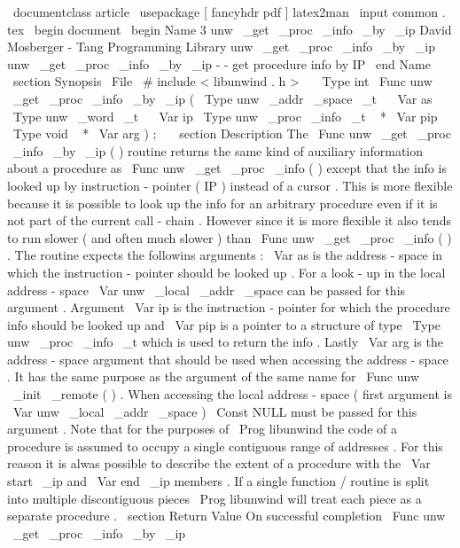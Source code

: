 \
documentclass
{
article
}
\
usepackage
[
fancyhdr
pdf
]
{
latex2man
}
\
input
{
common
.
tex
}
\
begin
{
document
}
\
begin
{
Name
}
{
3
}
{
unw
\
_get
\
_proc
\
_info
\
_by
\
_ip
}
{
David
Mosberger
-
Tang
}
{
Programming
Library
}
{
unw
\
_get
\
_proc
\
_info
\
_by
\
_ip
}
unw
\
_get
\
_proc
\
_info
\
_by
\
_ip
-
-
get
procedure
info
by
IP
\
end
{
Name
}
\
section
{
Synopsis
}
\
File
{
\
#
include
<
libunwind
.
h
>
}
\
\
\
Type
{
int
}
\
Func
{
unw
\
_get
\
_proc
\
_info
\
_by
\
_ip
}
(
\
Type
{
unw
\
_addr
\
_space
\
_t
~
}
\
Var
{
as
}
\
Type
{
unw
\
_word
\
_t
~
}
\
Var
{
ip
}
\
Type
{
unw
\
_proc
\
_info
\
_t
~
*
}
\
Var
{
pip
}
\
Type
{
void
~
*
}
\
Var
{
arg
}
)
;
\
\
\
section
{
Description
}
The
\
Func
{
unw
\
_get
\
_proc
\
_info
\
_by
\
_ip
}
(
)
routine
returns
the
same
kind
of
auxiliary
information
about
a
procedure
as
\
Func
{
unw
\
_get
\
_proc
\
_info
}
(
)
except
that
the
info
is
looked
up
by
instruction
-
pointer
(
IP
)
instead
of
a
cursor
.
This
is
more
flexible
because
it
is
possible
to
look
up
the
info
for
an
arbitrary
procedure
even
if
it
is
not
part
of
the
current
call
-
chain
.
However
since
it
is
more
flexible
it
also
tends
to
run
slower
(
and
often
much
slower
)
than
\
Func
{
unw
\
_get
\
_proc
\
_info
}
(
)
.
The
routine
expects
the
followins
arguments
:
\
Var
{
as
}
is
the
address
-
space
in
which
the
instruction
-
pointer
should
be
looked
up
.
For
a
look
-
up
in
the
local
address
-
space
\
Var
{
unw
\
_local
\
_addr
\
_space
}
can
be
passed
for
this
argument
.
Argument
\
Var
{
ip
}
is
the
instruction
-
pointer
for
which
the
procedure
info
should
be
looked
up
and
\
Var
{
pip
}
is
a
pointer
to
a
structure
of
type
\
Type
{
unw
\
_proc
\
_info
\
_t
}
which
is
used
to
return
the
info
.
Lastly
\
Var
{
arg
}
is
the
address
-
space
argument
that
should
be
used
when
accessing
the
address
-
space
.
It
has
the
same
purpose
as
the
argument
of
the
same
name
for
\
Func
{
unw
\
_init
\
_remote
}
(
)
.
When
accessing
the
local
address
-
space
(
first
argument
is
\
Var
{
unw
\
_local
\
_addr
\
_space
}
)
\
Const
{
NULL
}
must
be
passed
for
this
argument
.
Note
that
for
the
purposes
of
\
Prog
{
libunwind
}
the
code
of
a
procedure
is
assumed
to
occupy
a
single
contiguous
range
of
addresses
.
For
this
reason
it
is
alwas
possible
to
describe
the
extent
of
a
procedure
with
the
\
Var
{
start
\
_ip
}
and
\
Var
{
end
\
_ip
}
members
.
If
a
single
function
/
routine
is
split
into
multiple
discontiguous
pieces
\
Prog
{
libunwind
}
will
treat
each
piece
as
a
separate
procedure
.
\
section
{
Return
Value
}
On
successful
completion
\
Func
{
unw
\
_get
\
_proc
\
_info
\
_by
\
_ip
}
